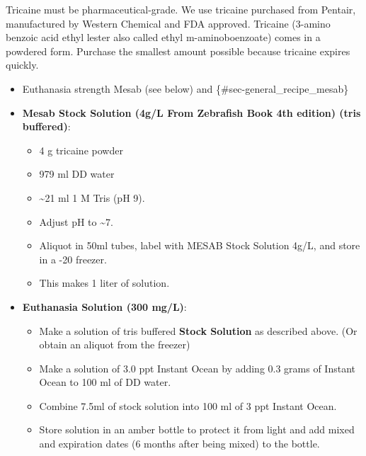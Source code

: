 \documentclass[
  letterpaper,
  DIV=11,
  numbers=noendperiod]{scrreprt}
\providecommand{\tightlist}{%
  \setlength{\itemsep}{0pt}\setlength{\parskip}{0pt}}\usepackage{longtable,booktabs,array}
\begin{document}
\begin{tcolorbox}[enhanced jigsaw, rightrule=.15mm, title=\textcolor{quarto-callout-warning-color}{\faExclamationTriangle}\hspace{0.5em}{NOTES}, titlerule=0mm, opacitybacktitle=0.6, toprule=.15mm, bottomrule=.15mm, opacityback=0, left=2mm, colframe=quarto-callout-warning-color-frame, breakable, coltitle=black, colback=white, colbacktitle=quarto-callout-warning-color!10!white, bottomtitle=1mm, leftrule=.75mm, toptitle=1mm, arc=.35mm]

Tricaine must be pharmaceutical-grade. We use tricaine purchased from
Pentair, manufactured by Western Chemical and FDA approved. Tricaine
(3-amino benzoic acid ethyl lester also called ethyl m-aminoboenzoate)
comes in a powdered form. Purchase the smallest amount possible because
tricaine expires quickly.

\end{tcolorbox}

\begin{itemize}
\item
  Euthanasia strength Mesab (see below) and
  \{\#sec-general\_recipe\_mesab\}
\item
  \textbf{Mesab Stock Solution (4g/L From Zebrafish Book 4th edition)
  (tris buffered)}:

  \begin{itemize}
  \tightlist
  \item
    4 g tricaine powder
  \item
    979 ml DD water
  \item
    \textasciitilde21 ml 1 M Tris (pH 9).
  \item
    Adjust pH to \textasciitilde7.
  \item
    Aliquot in 50ml tubes, label with MESAB Stock Solution 4g/L, and
    store in a -20 freezer.
  \item
    This makes 1 liter of solution.
  \end{itemize}
\item
  \textbf{Euthanasia Solution (300 mg/L)}:

  \begin{itemize}
  \tightlist
  \item
    Make a solution of tris buffered \textbf{Stock Solution} as
    described above. (Or obtain an aliquot from the freezer)
  \item
    Make a solution of 3.0 ppt Instant Ocean by adding 0.3 grams of
    Instant Ocean to 100 ml of DD water.
  \item
    Combine 7.5ml of stock solution into 100 ml of 3 ppt Instant Ocean.
  \item
    Store solution in an amber bottle to protect it from light and add
    mixed and expiration dates (6 months after being mixed) to the
    bottle.
  \end{itemize}
\end{itemize}
\end{document}
